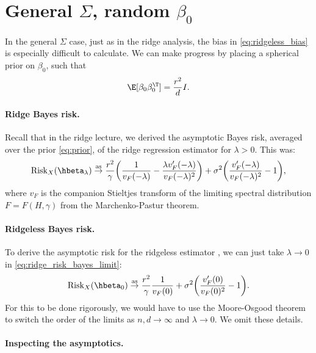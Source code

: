 \documentclass{article}
\begin{document}
\section{General $\Sigma$, random $\beta_0$}

In the general $\Sigma$ case, just as in the ridge analysis, the bias in 
\eqref{eq:ridgeless_bias} is especially difficult to calculate. We can make
progress by placing a spherical prior on $\beta_0$, such that        
\begin{equation}
\label{eq:prior}
\E[\beta_0 \beta_0^\T] = \frac{r^2}{d} I.
\end{equation}

\paragraph{Ridge Bayes risk.}

Recall that in the ridge lecture, we derived the asymptotic Bayes risk, averaged
over the prior \eqref{eq:prior}, of the ridge regression estimator
 for $\lambda>0$.
This was: 
\begin{equation}
\label{eq:ridge_risk_bayes_limit}
\Risk_X(\hbeta_\lambda) \asto \frac{r^2}{\gamma} \bigg( \frac{1}{v_F(-\lambda)}
- \frac{\lambda v'_F(-\lambda)}{v_F(-\lambda)^2} \bigg) + \sigma^2 \bigg(  
\frac{v'_F(-\lambda)}{v_F(-\lambda)^2} - 1 \bigg),
\end{equation}
where $v_F$ is the companion Stieltjes transform of the limiting spectral 
distribution $F = F(H, \gamma)$ from the Marchenko-Pastur theorem.

\paragraph{Ridgeless Bayes risk.}

To derive the asymptotic risk for the ridgeless estimator , we can just take $\lambda \to 0$ in
\eqref{eq:ridge_risk_bayes_limit}: 
\begin{equation}
\label{eq:ridgeless_risk_bayes_limit}
\Risk_X(\hbeta_0) \asto \frac{r^2}{\gamma} \frac{1}{v_F(0)} + \sigma^2
\bigg(\frac{v'_F(0)}{v_F(0)^2} - 1 \bigg).  
\end{equation}
For this to be done rigorously, we would have to use the Moore-Osgood theorem
to switch the order of the limits as $n,d \to \infty$ and $\lambda \to 0$. We
omit these details. 

\paragraph{Inspecting the asymptotics.}
\end{document}
